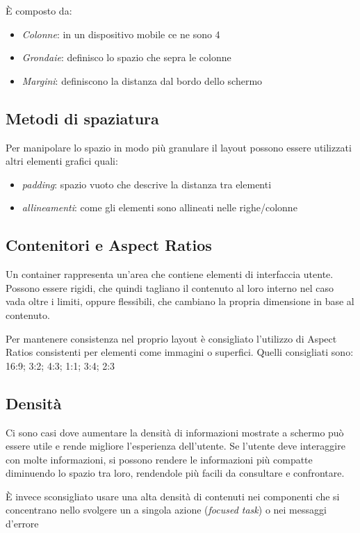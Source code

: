 \documentclass[12pt, a4paper]{report}
\begin{document}
			È composto da:
			\begin{itemize}
				\item \textit{Colonne}: in un dispositivo mobile ce ne sono 4
				\item \textit{Grondaie}: definisco lo spazio che sepra le colonne
				\item \textit{Margini}: definiscono la distanza dal bordo dello schermo
			\end{itemize}

		\subsection{Metodi di spaziatura}
			Per manipolare lo spazio in modo più granulare il layout possono essere utilizzati altri elementi grafici quali:
			\begin{itemize}
				\item \textit{padding}: spazio vuoto che descrive la distanza tra elementi
				\item \textit{allineamenti}: come gli elementi sono allineati nelle righe/colonne
			\end{itemize}

		\subsection{Contenitori e Aspect Ratios}
			Un container rappresenta un'area che contiene elementi di interfaccia utente.
			Possono essere rigidi, che quindi tagliano il contenuto al loro interno nel caso vada oltre i limiti, oppure flessibili, che cambiano la propria dimensione in base al contenuto.

			Per mantenere consistenza nel proprio layout è consigliato l'utilizzo di Aspect Ratios consistenti per elementi come immagini o superfici. Quelli consigliati sono: 16:9; 3:2; 4:3; 1:1; 3:4; 2:3 \cite{layout_containers}

		\subsection{Densità}
			Ci sono casi dove aumentare la densità di informazioni mostrate a schermo può essere utile e rende migliore l'esperienza dell'utente.
			Se l'utente deve interaggire con molte informazioni, si possono rendere le informazioni più compatte diminuendo lo spazio tra loro, rendendole più facili da consultare e confrontare.

			È invece sconsigliato usare una alta densità di contenuti nei componenti che si concentrano nello svolgere un a singola azione (\textit{focused task}) o nei messaggi d'errore
\end{document}

